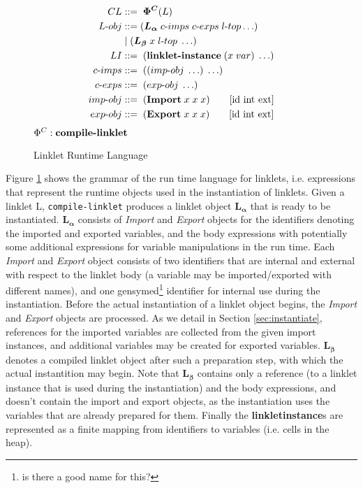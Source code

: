\documentclass[sigplan,screen,anonymous]{acmart}
\def\dash {\text{-}}
\begin{document}
\def\la {\bm{L_\alpha}}
\def\lb {\bm{L_\beta}}

\begin{figure}[tbp]
  \begin{align*}
    CL             &::=\; \bm{\Phi^C}(L)\\
    L\dash obj     &::= (\la\; c\dash imps \; c\dash exps \; l\dash top \ldots)\\
    \;           &\;|\; (\lb\; x\; l\dash top\; \ldots) \\
    LI             &::=\; (\textbf{linklet\dash instance}\; (x\; var)\; \ldots) \\
    c\dash imps    &::=\; ((imp\dash obj\; \ldots)\; \ldots)\\
    c\dash exps    &::=\; (exp\dash obj\; \ldots)\\
    imp\dash obj   &::=\; (\textbf{Import}\; x\; x\; x) \tag*{[id int ext]} \\
    exp\dash obj   &::=\; (\textbf{Export}\; x\; x\; x) \tag*{[id int ext]} \\
  \end{align*}
  \hfill \footnotesize $\Phi^C : \textbf{compile\dash linklet}$
\caption{Linklet Runtime Language}
\label{fig:linklet-runtime}
\end{figure}

Figure \ref{fig:linklet-runtime} shows the grammar of the run\dash
time language for linklets, i.e. expressions that represent the
run\dash time objects used in the instantiation of linklets. Given a
linklet L, \verb|compile-linklet| produces a linklet object $\la$ that
is ready to be instantiated. $\la$ consists of \textit{Import} and
\textit{Export} objects for the identifiers denoting the imported and
exported variables, and the body expressions with potentially some
additional expressions for variable manipulations in the run\dash
time. Each \textit{Import} and \textit{Export} object consists of two
identifiers that are internal and external with respect to the linklet
body (a variable may be imported/exported with different names), and
one gensymed\footnote{is there a good name for this?} identifier for
internal use during the instantiation. Before the actual instantiation
of a linklet object begins, the \textit{Import} and \textit{Export}
objects are processed. As we detail in Section \ref{sec:instantiate},
references for the imported variables are collected from the given
import instances, and additional variables may be created for exported
variables. $\lb$ denotes a compiled linklet object after such a
preparation step, with which the actual instantition may begin. Note
that $\lb$ contains only a reference (to a linklet instance that is
used during the instantiation) and the body expressions, and doesn't
contain the import and export objects, as the instantiation uses the
variables that are already prepared for them. Finally the
\textbf{linklet\dash instance}s are represented as a finite mapping
from identifiers to variables (i.e. cells in the heap).
\end{document}
